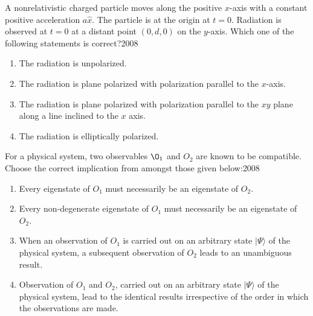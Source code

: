     \item  A nonrelativistic charged particle moves along the positive $x$-axis with a constant positive acceleration $a \hat{x}$. The particle is at the origin at $t=0$. Radiation is observed at $t=0$ at a distant point $(0, d, 0)$ on the $y$-axis. Which one of the following statements is correct?\hfill{2008}
        
            \begin{enumerate}
             \item The radiation is unpolarized.
\item The radiation is plane polarized with polarization parallel to the $x$-axis.
\item The radiation is plane polarized with polarization parallel to the $x y$ plane along a line inclined to the $x$ axis.
\item The radiation is elliptically polarized.
            \end{enumerate}



      

    \item For a physical system, two observables $\O_{1}$ and $O_{2}$ are known to be compatible. Choose the correct implication from amongst those given below:\hfill{2008}
		
			\begin{enumerate}
	\item Every eigenstate of ${O}_{1}$ must necessarily be an eigenstate of ${O}_{2}$.
\item Every non-degenerate eigenstate of ${O}_{1}$ must necessarily be an eigenstate of ${O}_{2}$.
\item When an observation of $O_{1}$ is carried out on an arbitrary state $|\Psi\rangle$ of the physical system, a subsequent observation of ${O}_{2}$ leads to an unambiguous result.
\item Observation of ${O}_{1}$ and ${O}_{2}$, carried out on an arbitrary state $|\Psi\rangle$ of the physical system, lead to the identical results irrespective of the order in which the observations are made.
	\end{enumerate}
		


